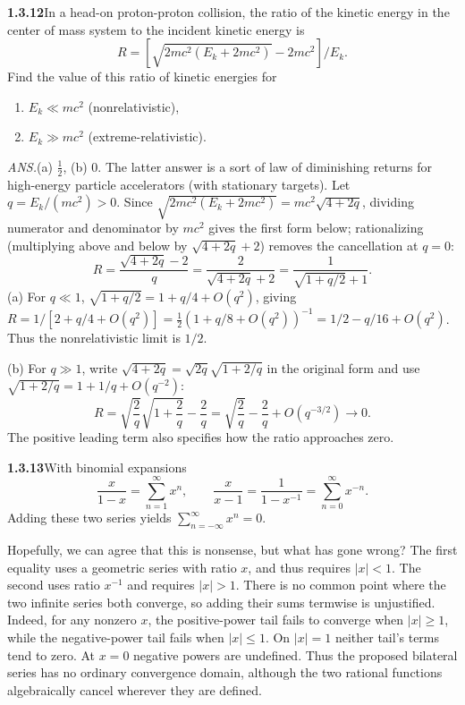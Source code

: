 \par\bigskip
\noindent\textbf{1.3.12}\quad In a head-on proton-proton collision, the ratio
of the kinetic energy in the center of mass system to the incident kinetic
energy is
\[
R=\left[\sqrt{2mc^{2}(E_{k}+2mc^{2})}-2mc^{2}\right]/E_{k}.
\]
Find the value of this ratio of kinetic energies for
\begin{enumerate}
\item[(a)] $E_{k}\ll mc^{2}$ (nonrelativistic),
\item[(b)] $E_{k}\gg mc^{2}$ (extreme-relativistic).
\end{enumerate}
\par\nobreak\hfill\emph{ANS.}\enspace (a) $\frac{1}{2}$, (b) $0$. The latter
answer is a sort of law of diminishing returns for high-energy particle
accelerators (with stationary targets).
\solution
Let $q=E_k/(mc^2)>0$. Since
$\sqrt{2mc^2(E_k+2mc^2)}=mc^2\sqrt{4+2q}$, dividing numerator and
denominator by $mc^2$ gives the first form below; rationalizing
(multiplying above and below by $\sqrt{4+2q}+2$) removes the
cancellation at $q=0$:
\[
 R=\frac{\sqrt{4+2q}-2}{q}
   =\frac2{\sqrt{4+2q}+2}
   =\frac1{\sqrt{1+q/2}+1}.
\]
(a) For $q\ll1$, $\sqrt{1+q/2}=1+q/4+O(q^2)$, giving
$R=1/[2+q/4+O(q^2)]=\frac12(1+q/8+O(q^2))^{-1}=1/2-q/16+O(q^2)$.
Thus the nonrelativistic limit is $1/2$.

(b) For $q\gg1$, write $\sqrt{4+2q}=\sqrt{2q}\sqrt{1+2/q}$ in the
original form and use $\sqrt{1+2/q}=1+1/q+O(q^{-2})$:
\[
 R=\sqrt{\frac2q}\sqrt{1+\frac2q}-\frac2q
 =\sqrt{\frac2q}-\frac2q+O(q^{-3/2})\longrightarrow0.
\]
The positive leading term also specifies how the ratio approaches zero.


\par\bigskip
\noindent\textbf{1.3.13}\quad With binomial expansions
\[
\frac{x}{1-x}=\sum_{n=1}^{\infty}x^{n},\qquad
\frac{x}{x-1}=\frac{1}{1-x^{-1}}=\sum_{n=0}^{\infty}x^{-n}.
\]
Adding these two series yields $\sum_{n=-\infty}^{\infty}x^{n}=0$.

Hopefully, we can agree that this is nonsense, but what has gone wrong?
\solution
The first equality uses a geometric series with ratio $x$, and thus
requires $|x|<1$. The second uses ratio $x^{-1}$ and requires $|x|>1$.
There is no common point where the two infinite series both converge,
so adding their sums termwise is unjustified.
Indeed, for any nonzero $x$, the positive-power tail fails to converge
when $|x|\ge1$, while the negative-power tail fails when $|x|\le1$.
On $|x|=1$ neither tail's terms tend to zero. At $x=0$ negative powers
are undefined. Thus the proposed bilateral series has no ordinary
convergence domain, although the two rational functions algebraically
cancel wherever they are defined.


